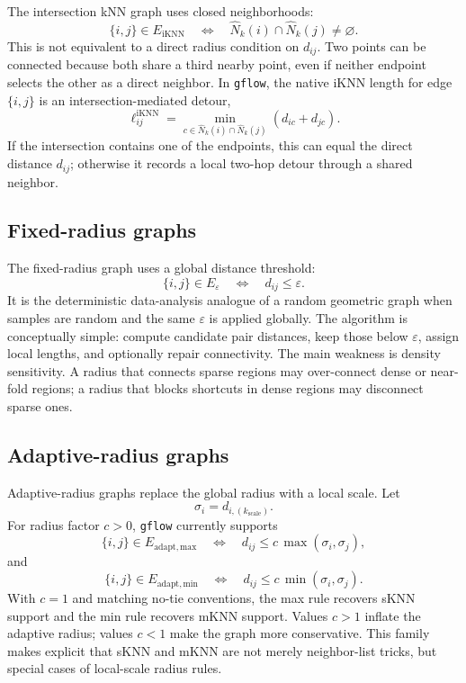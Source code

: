 \documentclass[11pt]{article}
\newcommand{\eps}{\varepsilon}
\begin{document}
The intersection kNN graph uses closed neighborhoods:
\[
  \{i,j\}\in E_{\mathrm{iKNN}}
  \quad\Longleftrightarrow\quad
  \widehat{N}_k(i)\cap \widehat{N}_k(j)\ne\varnothing .
\]
This is not equivalent to a direct radius condition on \(d_{ij}\).  Two points can be
connected because both share a third nearby point, even if neither endpoint selects the
other as a direct neighbor.  In \texttt{gflow}, the native iKNN length for edge \(\{i,j\}\)
is an intersection-mediated detour,
\[
  \ell_{ij}^{\mathrm{iKNN}}
  =
  \min_{c\in \widehat{N}_k(i)\cap \widehat{N}_k(j)}
  \left(d_{ic}+d_{jc}\right).
\]
If the intersection contains one of the endpoints, this can equal the direct distance
\(d_{ij}\); otherwise it records a local two-hop detour through a shared neighbor.

\subsection{Fixed-radius graphs}

The fixed-radius graph uses a global distance threshold:
\[
  \{i,j\}\in E_\eps
  \quad\Longleftrightarrow\quad
  d_{ij}\le \eps .
\]
It is the deterministic data-analysis analogue of a random geometric graph when samples
are random and the same \(\eps\) is applied globally.  The algorithm is conceptually simple:
compute candidate pair distances, keep those below \(\eps\), assign local lengths, and
optionally repair connectivity.  The main weakness is density sensitivity.  A radius that
connects sparse regions may over-connect dense or near-fold regions; a radius that blocks
shortcuts in dense regions may disconnect sparse ones.

\subsection{Adaptive-radius graphs}

Adaptive-radius graphs replace the global radius with a local scale.  Let
\[
  \sigma_i=d_{i,(k_{\mathrm{scale}})}.
\]
For radius factor \(c>0\), \texttt{gflow} currently supports
\[
  \{i,j\}\in E_{\mathrm{adapt,max}}
  \quad\Longleftrightarrow\quad
  d_{ij}\le c\,\max(\sigma_i,\sigma_j),
\]
and
\[
  \{i,j\}\in E_{\mathrm{adapt,min}}
  \quad\Longleftrightarrow\quad
  d_{ij}\le c\,\min(\sigma_i,\sigma_j).
\]
With \(c=1\) and matching no-tie conventions, the max rule recovers sKNN support and the
min rule recovers mKNN support.  Values \(c>1\) inflate the adaptive radius; values
\(c<1\) make the graph more conservative.  This family makes explicit that sKNN and mKNN
are not merely neighbor-list tricks, but special cases of local-scale radius rules.
\end{document}
